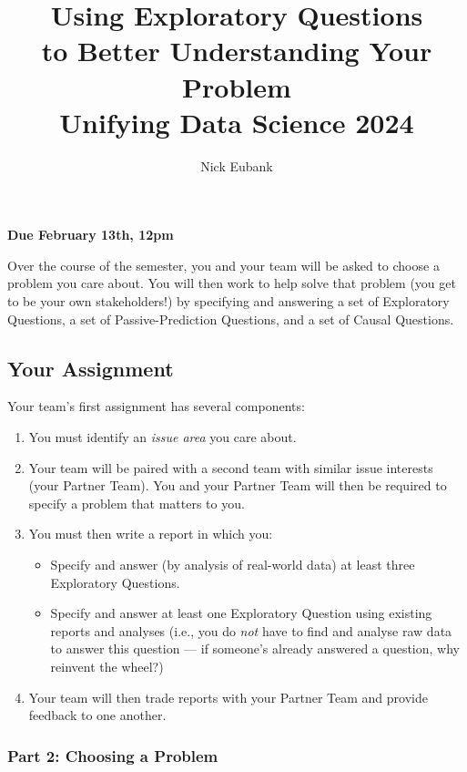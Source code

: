 \documentclass[12pt]{article}
\title{Using Exploratory Questions \\ to Better Understanding Your Problem \\ Unifying Data Science 2024}
\author{Nick Eubank}
\begin{document}
\maketitle

\begin{center}
     \textbf{Due February 13th, 12pm}
\end{center}

Over the course of the semester, you and your team will be asked to choose a problem you care about. You will then work to help solve that problem (you get to be your own stakeholders!) by specifying and answering a set of Exploratory Questions, a set of Passive-Prediction Questions, and a set of Causal Questions. 

\subsection*{Your Assignment}

Your team's first assignment has several components:

\begin{enumerate}
    \item You must identify an \emph{issue area} you care about. 
    \item Your team will be paired with a second team with similar issue interests (your Partner Team). You and your Partner Team will then be required to specify a problem that matters to you.
    \item You must then write a report in which you:
    \begin{itemize}
        \item Specify and answer (by analysis of real-world data) at least three Exploratory Questions.
        \item Specify and answer at least one Exploratory Question using existing reports and analyses (i.e., you do \emph{not} have to find and analyse raw data to answer this question — if someone's already answered a question, why reinvent the wheel?)
    \end{itemize}
    \item Your team will then trade reports with your Partner Team and provide feedback to one another.
\end{enumerate} 

\subsubsection*{Part 2: Choosing a Problem}
\end{document}
